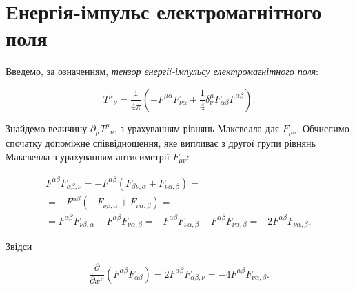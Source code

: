 \section{Енергія-імпульс електромагнітного поля}

Введемо, за означенням, \emph{тензор енергії-імпульсу електромагнітного поля}:

\begin{equation}\label{eq:EMT}
    T^{\mu}{}_{\nu} = \frac{1}{4\pi}\!\left(
    -F^{\mu\alpha}F_{\nu\alpha} + \frac{1}{4}\delta^{\mu}_{\nu}F_{\alpha\beta}F^{\alpha\beta}
    \right).
\end{equation}

Знайдемо величину $\partial_{\mu}T^{\mu}{}_{\nu}$, з урахуванням рівнянь Максвелла для $F_{\mu\nu}$. Обчислимо спочатку
допоміжне співвідношення, яке випливає з другої групи рівнянь Максвелла з урахуванням антисиметрії $F_{\mu\nu}$:

\begin{multline*}
    F^{\alpha\beta} F_{\alpha\beta,\nu}
    = - F^{\alpha\beta} \left( F_{\beta\nu,\alpha} + F_{\nu\alpha,\beta} \right) = \\
    = - F^{\alpha\beta} \left( - F_{\nu\beta,\alpha} + F_{\nu\alpha,\beta} \right) = \\
    = F^{\alpha\beta} F_{\nu\beta,\alpha} - F^{\alpha\beta} F_{\nu\alpha,\beta}
    = -F^{\alpha\beta} F_{\nu\alpha,\beta} - F^{\alpha\beta} F_{\nu\alpha,\beta}
    = -2 F^{\alpha\beta} F_{\nu\alpha,\beta},
\end{multline*}


Звідси

\begin{equation*}
    \frac{\partial}{\partial x^\nu}\!\left(F^{\alpha\beta} F_{\alpha\beta}\right)
    = 2 F^{\alpha\beta} F_{\alpha\beta,\nu}
    = -4 F^{\alpha\beta} F_{\nu\alpha,\beta}.
\end{equation*}

